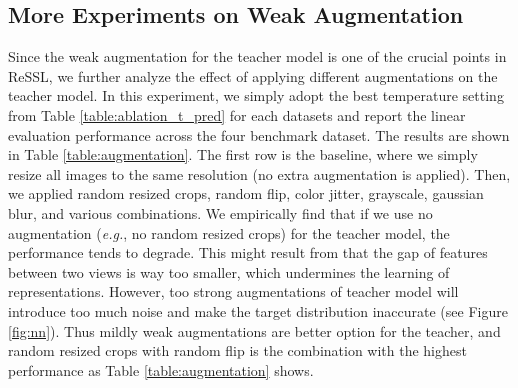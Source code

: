 \documentclass{article}
\newcommand{\<}{\left\langle}
\renewcommand{\>}{\right\rangle}
\newcommand{\eg}{{\emph{e.g.}}}
\begin{document}
\subsection{More Experiments on Weak Augmentation}
Since the weak augmentation for the teacher model is one of the crucial points in ReSSL, we further analyze the effect of applying different augmentations on the teacher model. In this experiment, we simply adopt the best temperature setting from Table \ref{table:ablation_t_pred} for each datasets and report the linear evaluation performance across the four benchmark dataset.  The results are shown in Table \ref{table:augmentation}. The first row is the baseline, where we simply resize all images to the same resolution (no extra augmentation is applied). Then, we applied random resized crops, random flip, color jitter, grayscale, gaussian blur, and various combinations. We empirically find that if we use no augmentation (\eg, no random resized crops) for the teacher model, the performance tends to degrade. This might result from that the gap of features between two views is way too smaller, which undermines the learning of representations. However, too strong augmentations of teacher model will introduce too much noise and make the target distribution inaccurate (see Figure \ref{fig:nn}). Thus mildly weak augmentations are better option for the teacher, and random resized crops with random flip is the combination with the highest performance as Table \ref{table:augmentation} shows.
\end{document}
